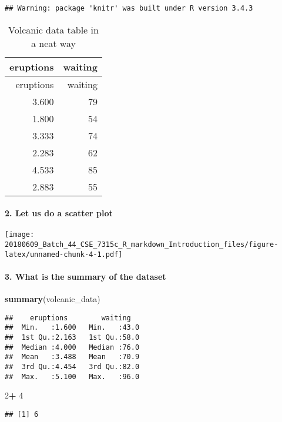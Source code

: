 \documentclass[]{article}
\newenvironment{Shaded}{\begin{snugshade}}{\end{snugshade}}
\newcommand{\DecValTok}[1]{\textcolor[rgb]{0.00,0.00,0.81}{#1}}
\newcommand{\KeywordTok}[1]{\textcolor[rgb]{0.13,0.29,0.53}{\textbf{#1}}}
\newcommand{\NormalTok}[1]{#1}
\newcommand{\OperatorTok}[1]{\textcolor[rgb]{0.81,0.36,0.00}{\textbf{#1}}}
\newcommand{\StringTok}[1]{\textcolor[rgb]{0.31,0.60,0.02}{#1}}
\let\oldparagraph\paragraph
\renewcommand{\paragraph}[1]{\oldparagraph{#1}\mbox{}}
\begin{document}
\begin{verbatim}
## Warning: package 'knitr' was built under R version 3.4.3
\end{verbatim}

\begin{longtable}[]{@{}rr@{}}
\caption{Volcanic data table in a neat way}\tabularnewline
\toprule
eruptions & waiting\tabularnewline
\midrule
\endfirsthead
\toprule
eruptions & waiting\tabularnewline
\midrule
\endhead
3.600 & 79\tabularnewline
1.800 & 54\tabularnewline
3.333 & 74\tabularnewline
2.283 & 62\tabularnewline
4.533 & 85\tabularnewline
2.883 & 55\tabularnewline
\bottomrule
\end{longtable}

\hypertarget{let-us-do-a-scatter-plot}{%
\paragraph{2. Let us do a scatter plot}\label{let-us-do-a-scatter-plot}}

\texttt{[image: 20180609\_Batch\_44\_CSE\_7315c\_R\_markdown\_Introduction\_files/figure-latex/unnamed-chunk-4-1.pdf]}

\hypertarget{what-is-the-summary-of-the-dataset}{%
\paragraph{3. What is the summary of the
dataset}\label{what-is-the-summary-of-the-dataset}}

\begin{Shaded}
\begin{Highlighting}[]
\KeywordTok{summary}\NormalTok{(volcanic_data)}
\end{Highlighting}
\end{Shaded}

\begin{verbatim}
##    eruptions        waiting    
##  Min.   :1.600   Min.   :43.0  
##  1st Qu.:2.163   1st Qu.:58.0  
##  Median :4.000   Median :76.0  
##  Mean   :3.488   Mean   :70.9  
##  3rd Qu.:4.454   3rd Qu.:82.0  
##  Max.   :5.100   Max.   :96.0
\end{verbatim}

\begin{Shaded}
\begin{Highlighting}[]
\DecValTok{2}\OperatorTok{+}\StringTok{ }\DecValTok{4}
\end{Highlighting}
\end{Shaded}

\begin{verbatim}
## [1] 6
\end{verbatim}
\end{document}
